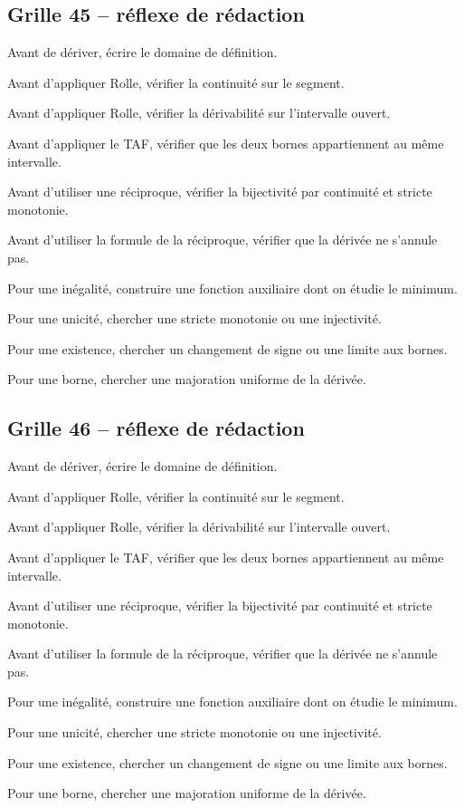 \documentclass[11pt,a4paper]{article}
\begin{document}
\subsection*{Grille 45 -- réflexe de rédaction}

\begin{methodebox}

Avant de dériver, écrire le domaine de définition.

Avant d'appliquer Rolle, vérifier la continuité sur le segment.

Avant d'appliquer Rolle, vérifier la dérivabilité sur l'intervalle ouvert.

Avant d'appliquer le TAF, vérifier que les deux bornes appartiennent au même intervalle.

Avant d'utiliser une réciproque, vérifier la bijectivité par continuité et stricte monotonie.

Avant d'utiliser la formule de la réciproque, vérifier que la dérivée ne s'annule pas.

Pour une inégalité, construire une fonction auxiliaire dont on étudie le minimum.

Pour une unicité, chercher une stricte monotonie ou une injectivité.

Pour une existence, chercher un changement de signe ou une limite aux bornes.

Pour une borne, chercher une majoration uniforme de la dérivée.

\end{methodebox}

\subsection*{Grille 46 -- réflexe de rédaction}

\begin{methodebox}

Avant de dériver, écrire le domaine de définition.

Avant d'appliquer Rolle, vérifier la continuité sur le segment.

Avant d'appliquer Rolle, vérifier la dérivabilité sur l'intervalle ouvert.

Avant d'appliquer le TAF, vérifier que les deux bornes appartiennent au même intervalle.

Avant d'utiliser une réciproque, vérifier la bijectivité par continuité et stricte monotonie.

Avant d'utiliser la formule de la réciproque, vérifier que la dérivée ne s'annule pas.

Pour une inégalité, construire une fonction auxiliaire dont on étudie le minimum.

Pour une unicité, chercher une stricte monotonie ou une injectivité.

Pour une existence, chercher un changement de signe ou une limite aux bornes.

Pour une borne, chercher une majoration uniforme de la dérivée.

\end{methodebox}
\end{document}
